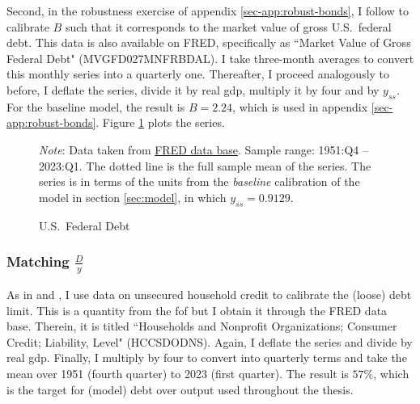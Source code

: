 \documentclass[a4paper,12pt]{article} %
\numberwithin{equation}{section} %
\numberwithin{figure}{section}
\numberwithin{table}{section}
\begin{document}
\begin{refsection}
\begin{appendices}
Second, in the robustness exercise of appendix \ref{sec-app:robust-bonds}, I follow \textcite{bayer2023} to calibrate $B$ such that it corresponds to the market value of gross U.S.~federal debt. This data is also available on FRED, specifically as ``Market Value of Gross Federal Debt" (MVGFD027MNFRBDAL). I take three-month averages to convert this monthly series into a quarterly one. Thereafter, I proceed analogously to before, I deflate the series, divide it by real \Gls{gdp}, multiply it by four and by $y_{ss}$. For the baseline model, the result is $B=2.24$, which is used in appendix \ref{sec-app:robust-bonds}. Figure \ref{fig:app-calibration-bonds} plots the series.

\begin{figure}[H]
    \centering
    \caption{U.S.~Federal Debt}
    \label{fig:app-calibration-bonds}
    

    \vspace{10pt}
    
    \begin{minipage}{0.75\textwidth} 
    \footnotesize
    \textit{Note}: Data taken from \href{https://fred.stlouisfed.org}{FRED data base}. Sample range: 1951:Q4 -- 2023:Q1. The dotted line is the full sample mean of the series. The series is in terms of the units from the \textit{baseline} calibration of the model in section \ref{sec:model}, in which $y_{ss} = 0.9129$.
    \end{minipage}
\end{figure}

\subsubsection*{Matching $\frac{D}{y}$}

As in \textcite{gl2017} and \textcite{bayer2023}, I use data on unsecured household credit to calibrate the (loose) debt limit. This is a quantity from the \Gls{fof} but I obtain it through the FRED data base. Therein, it is titled ``Households and Nonprofit Organizations; Consumer Credit; Liability, Level" (HCCSDODNS). Again, I deflate the series and divide by real \Gls{gdp}. Finally, I multiply by four to convert into quarterly terms and take the mean over 1951 (fourth quarter) to 2023 (first quarter). The result is $57\%$, which is the target for (model) debt over output used throughout the thesis. 


\end{appendices}
\end{refsection}
\end{document}
